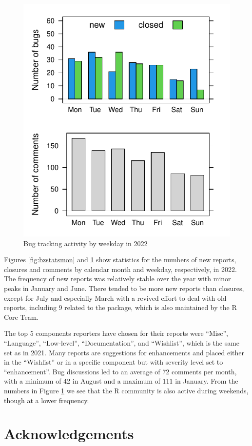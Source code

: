 \begin{figure}

{\centering \includegraphics[width=0.6\linewidth]{bzstats_wd} 

}

\caption{Bug tracking activity by weekday in 2022}\label{fig:bzstatswd}
\end{figure}

Figures \ref{fig:bzstatsmon} and \ref{fig:bzstatswd} show statistics for the numbers of new reports,
closures and comments by calendar month and weekday, respectively, in 2022.
The frequency of new reports was relatively stable over the year with minor
peaks in January and June. There tended to be more new reports than
closures, except for July and especially March with a revived effort
to deal with old reports, including 9 related to the  package,
which is also maintained by the R Core Team.

The top 5 components reporters have chosen for their reports were
``Misc'', ``Language'', ``Low-level'', ``Documentation'', and ``Wishlist'',
which is the same set as in 2021. Many reports are suggestions for
enhancements and placed either in the ``Wishlist'' or in a
specific component but with severity level set to ``enhancement''.
Bug discussions led to an average of 72 comments per month, with a minimum
of 42 in August and a maximum of 111 in January.
From the numbers in Figure \ref{fig:bzstatswd} we see that the R community is also active during
weekends, though at a lower frequency.

\hypertarget{acknowledgements}{%
\section*{Acknowledgements}\label{acknowledgements}}

